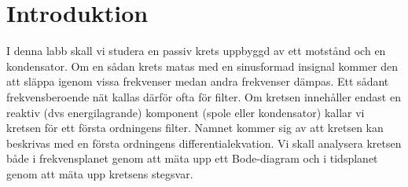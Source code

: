 %
%

\section{Introduktion}\label{intro}
I denna labb skall vi studera en passiv krets uppbyggd av ett motstånd och en
kondensator. Om en sådan krets matas med en sinusformad insignal kommer den att
släppa igenom vissa frekvenser medan andra frekvenser dämpas. Ett sådant
frekvensberoende nät kallas därför ofta för filter. Om kretsen innehåller
endast en reaktiv (dvs energilagrande) komponent (spole eller kondensator)
kallar vi kretsen för ett första ordningens filter. Namnet kommer sig av att
kretsen kan beskrivas med en första ordningens differentialekvation.
Vi skall analysera kretsen både i frekvensplanet genom att mäta upp ett
Bode-diagram och i tidsplanet genom att mäta upp kretsens stegsvar.


